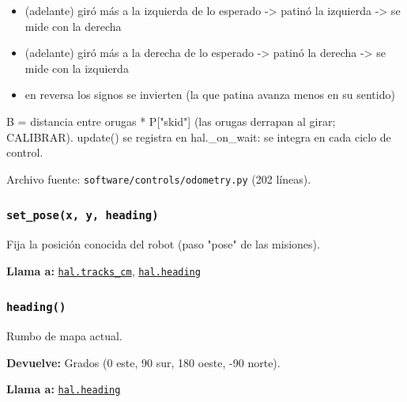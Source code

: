 \begin{itemize}\setlength\itemsep{0pt}
\item (adelante) giró más a la izquierda de lo esperado -> patinó la izquierda -> se mide con la derecha
\item (adelante) giró más a la derecha de lo esperado -> patinó la derecha -> se mide con la izquierda
\item en reversa los signos se invierten (la que patina avanza menos en su sentido)
\end{itemize}
B = distancia entre orugas * P["skid"] (las orugas derrapan al girar; CALIBRAR). update() se registra en hal.\_on\_wait: se integra en cada ciclo de control.

\noindent Archivo fuente: \texttt{software/controls/odometry.py} (202 l\'ineas).

\subsubsection{\texttt{set\_\allowbreak{}pose(x, y, heading)}}\label{fn:odometry:set-pose}
\noindent Fija la posición conocida del robot (paso "pose" de las misiones).

\par{}\par\smallskip
\noindent\textbf{Llama a:} \hyperref[fn:hal:tracks-cm]{\texttt{hal.tracks\_\allowbreak{}cm}}, \hyperref[fn:hal:heading]{\texttt{hal.heading}}\par

\subsubsection{\texttt{heading()}}\label{fn:odometry:heading}
\noindent Rumbo de mapa actual.

\noindent\textbf{Devuelve:} Grados (0 este, 90 sur, 180 oeste, -90 norte).\par
\noindent\textbf{Llama a:} \hyperref[fn:hal:heading]{\texttt{hal.heading}}\par

